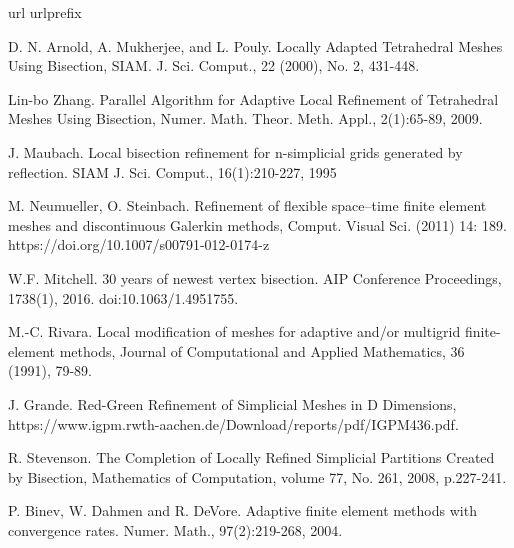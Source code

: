 \documentclass[a4paper,12pt]{amsart}
\numberwithin{equation}{section}
\begin{document}
\begin{thebibliography}{99}
\expandafter\ifx\csname url\endcsname\relax
  \def\url#1{\texttt{#1}}\fi
\expandafter\ifx\csname urlprefix\endcsname\relax\def\urlprefix{URL }\fi



D. N. Arnold, A. Mukherjee, and L. Pouly. Locally Adapted Tetrahedral Meshes Using Bisection, SIAM. J. Sci. Comput., 22 (2000), No. 2, 431-448.

Lin-bo Zhang. Parallel Algorithm for Adaptive Local Refinement
of Tetrahedral Meshes Using Bisection, Numer. Math. Theor. Meth. Appl., 2(1):65-89, 2009.

J. Maubach. Local bisection refinement for n-simplicial grids generated by reflection. SIAM J. Sci. Comput., 16(1):210-227, 1995

M. Neumueller, O. Steinbach. Refinement of flexible space–time finite element meshes and discontinuous Galerkin methods, Comput. Visual Sci. (2011) 14: 189. https://doi.org/10.1007/s00791-012-0174-z

W.F. Mitchell. 30 years of newest vertex bisection. AIP Conference Proceedings, 1738(1), 2016. doi:10.1063/1.4951755.

M.-C. Rivara. Local modification of meshes for adaptive and/or 
multigrid finite-element methods, Journal of Computational and  Applied Mathematics, 36 (1991), 79-89.


J. Grande. Red-Green Refinement of Simplicial Meshes in D Dimensions, https://www.igpm.rwth-aachen.de/Download/reports/pdf/IGPM436.pdf.

R. Stevenson. The Completion of Locally Refined Simplicial Partitions Created by Bisection, Mathematics of Computation, volume 77, No. 261, 2008, p.227-241.

P. Binev, W. Dahmen and R. DeVore. Adaptive finite element methods with convergence rates. Numer. Math., 
97(2):219-268, 2004.

\end{thebibliography}
\end{document}
